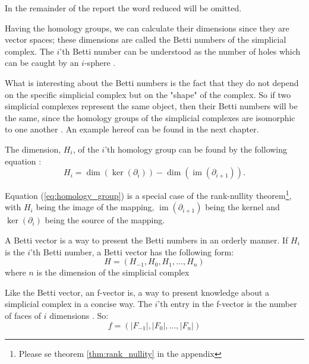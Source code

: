 \documentclass[11pt,a4paper,twoside]{report}
\DeclareMathOperator{\im}{im}
\begin{document}
In the remainder of the report the word reduced will be omitted.

Having the homology groups, we can calculate their dimensions since they are vector spaces; these dimensions are called the Betti numbers of the simplicial complex. The $i$'th Betti number can be understood as the number of holes which can be caught by an $i$-sphere \cite{wikiBetti}.

What is interesting about the Betti numbers is the fact that they do not depend on the  specific simplicial complex but on the "shape" of the complex. So if two simplicial complexes represent the same object, then their Betti numbers will be the same, since the homology groups of the simplicial complexes are isomorphic to one another \cite[p. 70]{Edelsbrunner}. An example hereof can be found in the next chapter.

The dimension, $H_i$, of the $i$'th homology group can be found by the following equation \cite[p.2]{Allgaier}:
\begin{equation}\label{eq:homology_group}
H_i = \dim(\ker(\partial_i))-\dim(\im(\partial_{i+1})).
\end{equation}

Equation (\ref{eq:homology_group}) is a special case of the rank-nullity theorem\footnote{Please se theorem \ref{thm:rank_nullity} in the appendix}, with $H_i$ being the image of the mapping, $\im(\partial_{i+1})$ being the kernel and $\ker(\partial_i)$ being the source of the mapping.

A Betti vector is a way to present the Betti numbers in an orderly manner. If $H_i$ is the $i$'th Betti number, a Betti vector has the following form:
\begin{equation*}
H = (H_{-1},H_0,H_1,\dots,H_n)
\end{equation*}
where $n$ is the dimension of the simplicial complex

Like the Betti vector, an f-vector is, a way to present knowledge about a simplicial complex in a concise way. The $i$'th entry in the f-vector is the number of faces of $i$ dimensions \cite[p.15]{Jonsson}. So:
\begin{equation*}
f = (|F_{-1}|,|F_0|,\dots,|F_n|)
\end{equation*}
\end{document}
